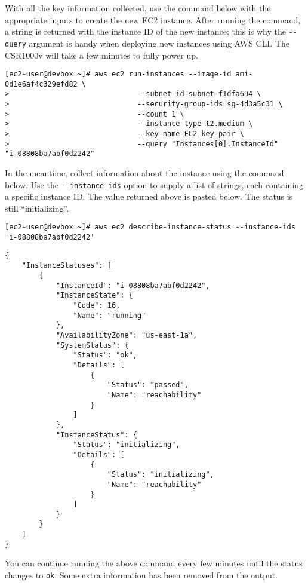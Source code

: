 With all the key information collected, use the command below with the
appropriate inputs to create the new EC2 instance. After running the command,
a string is returned with the instance ID of the new instance; this is why the
\verb|--query| argument is handy when deploying new instances using AWS CLI\@. The
CSR1000v will take a few minutes to fully power up.

\begin{verbatim}
[ec2-user@devbox ~]# aws ec2 run-instances --image-id ami-0d1e6af4c329efd82 \
>                              --subnet-id subnet-f1dfa694 \
>                              --security-group-ids sg-4d3a5c31 \
>                              --count 1 \
>                              --instance-type t2.medium \
>                              --key-name EC2-key-pair \
>                              --query "Instances[0].InstanceId"
"i-08808ba7abf0d2242"
\end{verbatim}

In the meantime, collect information about the instance using the command
below. Use the \verb|--instance-ids| option to supply a list of strings, each
containing a specific instance ID\@. The value returned above is pasted below.
The status is still ``initializing''.

\begin{verbatim}
[ec2-user@devbox ~]# aws ec2 describe-instance-status --instance-ids 'i-08808ba7abf0d2242'
\end{verbatim}

\begin{verbatim}
{
    "InstanceStatuses": [
        {
            "InstanceId": "i-08808ba7abf0d2242", 
            "InstanceState": {
                "Code": 16, 
                "Name": "running"
            }, 
            "AvailabilityZone": "us-east-1a", 
            "SystemStatus": {
                "Status": "ok", 
                "Details": [
                    {
                        "Status": "passed", 
                        "Name": "reachability"
                    }
                ]
            }, 
            "InstanceStatus": {
                "Status": "initializing", 
                "Details": [
                    {
                        "Status": "initializing", 
                        "Name": "reachability"
                    }
                ]
            }
        }
    ]
}
\end{verbatim}

You can continue running the above command every few minutes until the status
changes to \verb|ok|. Some extra information has been removed from the output.


